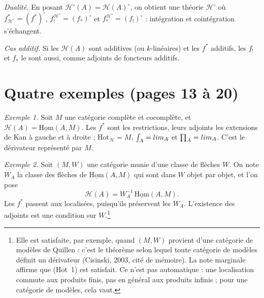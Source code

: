 \documentclass[11pt,a4paper]{article}
\begin{document}
\emph{Dualité.} En posant $\mathcal H^{\circ}(A) = \mathcal H(A)^{\circ}$,
on obtient une théorie $\mathcal H^{\circ}$ où $f^{*}_{\mathcal H^{\circ}} =
(f^{*})^{\circ}$, $f^{\mathcal H^{\circ}}_{!} = (f_{*})^{\circ}$ et
$f^{\mathcal H^{\circ}}_{*} = (f_{!})^{\circ}$ : intégration et cointégration
s'échangent.

\emph{Cas additif.} Si les $\mathcal H(A)$ sont additives (ou $k$-linéaires)
et les $f^{*}$ additifs, les $f_{!}$ et $f_{*}$ le sont aussi, comme adjoints
de foncteurs additifs.

\section*{Quatre exemples (pages 13 à 20)}

\emph{Exemple 1.} Soit $M$ une catégorie complète et cocomplète, et
$\mathcal H(A) = \underline{\mathrm{Hom}}(A, M)$. Les $f^{*}$ sont les
restrictions, leurs adjoints les extensions de Kan à gauche et à droite ;
$\mathrm{Hot}_{\mathcal H} = M$, $\int_A = \varinjlim_A$ et $\prod_A =
\varprojlim_A$. C'est le dérivateur représenté par $M$.

\emph{Exemple 2.} Soit $(M, W)$ une catégorie munie d'une classe de flèches
$W$. On note $W_A$ la classe des flèches de $\underline{\mathrm{Hom}}(A, M)$
qui sont dans $W$ objet par objet, et l'on pose
\[
  \mathcal H(A) = W_A^{-1}\,\underline{\mathrm{Hom}}(A, M).
\]
Les $f^{*}$ passent aux localisées, puisqu'ils préservent les $W_A$.
L'existence des adjoints est une condition sur $W$.\footnote{Elle est
satisfaite, par exemple, quand $(M, W)$ provient d'une catégorie de modèles
de Quillen : c'est le théorème selon lequel toute catégorie de modèles
définit un dérivateur (Cisinski, 2003, cité de mémoire). La note marginale
affirme que (Hot~1) est satisfait. Ce n'est pas automatique : une
localisation commute aux produits finis, pas en général aux produits
infinis ; pour une catégorie de modèles, cela vaut.}
\end{document}
